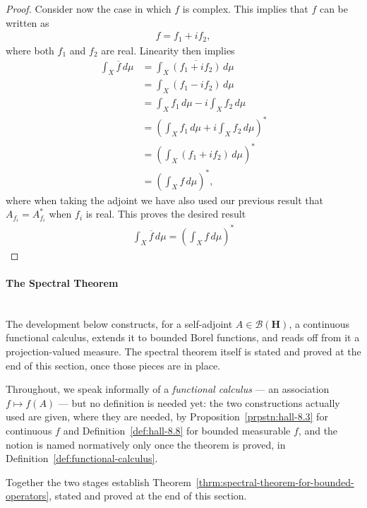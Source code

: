 \begin{proof}
Consider now the case in which $f$ is complex. This implies that $f$ can be written as
\begin{align}
    f = f_1 + if_2,
\end{align}
where both $f_1$ and $f_2$ are real. Linearity then implies
\begin{align}
    \int_X \overline{f} \, d\mu &= \int_X \overline{(f_1 + if_2)} \, d\mu \\
                                &= \int_X (f_1 - if_2) \, d\mu \\
                                &= \int_X f_1 \, d\mu - i \int_X f_2 \, d\mu \\
                                &= \left( \int_X f_1 \, d\mu + i \int_X f_2 \, d\mu \right)^* \\
                                &= \left( \int_X (f_1 + i f_2) \, d\mu \right)^* \\
                                &= \left( \int_X f \, d\mu \right)^*,
\end{align}
where when taking the adjoint we have also used our previous result that $A_{f_i} = A_{f_i}^*$ when $f_i$ is real. This proves the desired result
\begin{align}
    \int_X \overline{f} \, d\mu = \left( \int_X f \, d\mu \right)^*
\end{align}
\end{proof}

\paragraph{The Spectral Theorem}\mbox{}\\
The development below constructs, for a self-adjoint $A \in \mathcal{B}(\mathbf{H})$, a continuous functional calculus, extends it to bounded Borel functions, and reads off from it a projection-valued measure. The spectral theorem itself is stated and proved at the end of this section, once those pieces are in place.

Throughout, we speak informally of a \textit{functional calculus} — an association $f \mapsto f(A)$ — but no definition is needed yet: the two constructions actually used are given, where they are needed, by Proposition~\ref{prpstn:hall-8.3} for continuous $f$ and Definition~\ref{def:hall-8.8} for bounded measurable $f$, and the notion is named normatively only once the theorem is proved, in Definition~\ref{def:functional-calculus}.

Together the two stages establish Theorem~\ref{thrm:spectral-theorem-for-bounded-operators}, stated and proved at the end of this section.

